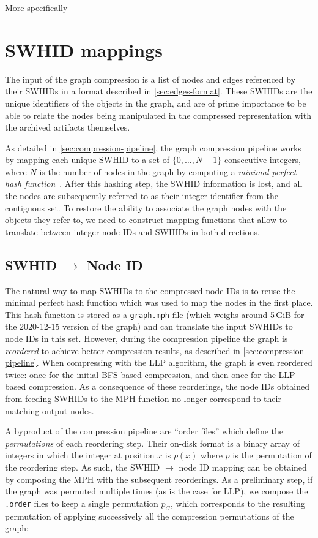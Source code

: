 More specifically %


\section{SWHID mappings}

The input of the graph compression is a list of nodes and edges referenced by
their \glspl{SWHID} in a format described in \cref{sec:edges-format}. These
\glspl{SWHID} are the unique identifiers of the objects in the graph, and are
of prime importance to be able to relate the nodes being manipulated in the
compressed representation with the archived artifacts themselves.

As detailed in \cref{sec:compression-pipeline}, the graph compression pipeline
works by mapping each unique \gls{SWHID} to a set of $\{0,\ldots,N-1\}$
consecutive integers, where $N$ is the number of nodes in the graph by
computing a \emph{minimal perfect hash function}~\cite{GOVFSCF}.
After this hashing step, the \gls{SWHID} information is lost, and all the nodes
are subsequently referred to as their integer identifier from the contiguous
set. To restore the ability to associate the graph nodes with the objects they
refer to, we need to construct mapping functions that allow to translate
between integer node IDs and \glspl{SWHID} in both directions.

\subsection{SWHID $\to$ Node ID}%
\label{sec:swhid2node}

The natural way to map \glspl{SWHID} to the compressed node IDs is to reuse the
minimal perfect hash function which was used to map the nodes in the first
place.
This hash function is stored as a \texttt{graph.mph} file (which weighs
around 5\,GiB for the 2020-12-15 version of the graph) and can translate the
input \glspl{SWHID} to node IDs in this set. However, during the compression
pipeline the graph is \emph{reordered} to achieve better compression results,
as described in \cref{sec:compression-pipeline}. When compressing with the
\gls{LLP} algorithm, the graph is even reordered twice: once for the initial
BFS-based compression, and then once for the LLP-based compression. As a
consequence of these reorderings, the node IDs obtained from feeding
\glspl{SWHID} to the \gls{MPH} function no longer correspond to their matching
output nodes.

A byproduct of the compression pipeline are ``order files'' which define
the \emph{permutations} of each reordering step. Their on-disk format is a
binary array of integers in which the integer at position $x$ is $p(x)$ where
$p$ is the permutation of the reordering step. As such, the \gls{SWHID} $\to$
node ID mapping can be obtained by composing the \gls{MPH} with the subsequent
reorderings. As a preliminary step, if the graph was permuted multiple times
(as is the case for \gls{LLP}), we compose the \texttt{.order} files to keep a
single permutation $p_G$, which corresponds to the resulting permutation of
applying successively all the compression permutations of the graph:


